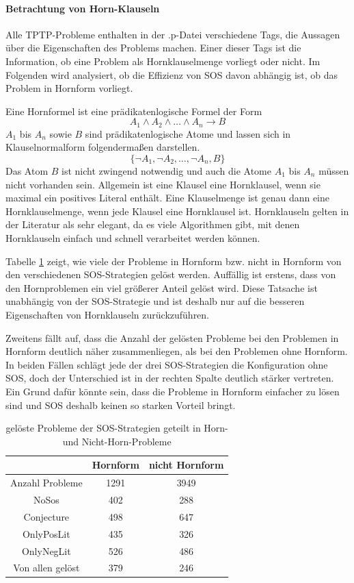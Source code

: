 		\paragraph{Betrachtung von Horn-Klauseln}
		Alle TPTP-Probleme enthalten in der .p-Datei verschiedene Tags, die Aussagen über die Eigenschaften des Problems machen. Einer dieser Tags ist die Information, ob eine Problem als Hornklauselmenge vorliegt oder nicht. Im Folgenden wird analysiert, ob die Effizienz von SOS davon abhängig ist, ob das Problem in Hornform vorliegt.
	
		Eine Hornformel ist eine prädikatenlogische Formel der Form
		$$A_1 \wedge A_2 \wedge \ldots \wedge A_n \rightarrow B$$
		$A_1$ bis $A_n$ sowie $B$ sind prädikatenlogische Atome und lassen sich in Klauselnormalform folgendermaßen darstellen.
		$$\{\neg A_1, \neg A_2, \ldots, \neg A_n, B\}$$
		Das Atom $B$ ist nicht zwingend notwendig und auch die Atome $A_1$ bis $A_n$ müssen nicht vorhanden sein. Allgemein ist eine Klausel eine Hornklausel, wenn sie maximal ein positives Literal enthält. \cite{Makowsky1987horn}
		Eine Klauselmenge ist genau dann eine Hornklauselmenge, wenn jede Klausel eine Hornklausel ist. Hornklauseln gelten in der Literatur als sehr elegant, da es viele Algorithmen gibt, mit denen Hornklauseln einfach und schnell verarbeitet werden können. \cite{Wild2017horn}
	
		Tabelle \ref{tab:Horn} zeigt, wie viele der Probleme in Hornform bzw. nicht in Hornform von den verschiedenen SOS-Strategien gelöst werden.
		Auffällig ist erstens, dass von den Hornproblemen ein viel größerer Anteil gelöst wird. Diese Tatsache ist unabhängig von der SOS-Strategie und ist deshalb nur auf die besseren Eigenschaften von Hornklauseln zurückzuführen.
		
		Zweitens fällt auf, dass die Anzahl der gelösten Probleme bei den Problemen in Hornform deutlich näher zusammenliegen, als bei den Problemen ohne Hornform. In beiden Fällen schlägt jede der drei SOS-Strategien die Konfiguration ohne SOS, doch der Unterschied ist in der rechten Spalte deutlich stärker vertreten. Ein Grund dafür könnte sein, dass die Probleme in Hornform einfacher zu lösen sind und SOS deshalb keinen so starken Vorteil bringt.
		\begin{table}
			\centering
			\begin{tabular}{|c|c|c|}
				\hline
				&Hornform & nicht Hornform \\
				\hline
				Anzahl Probleme & 1291 & 3949 \\
				\hline\hline
				NoSos & 402 & 288 \\
				\hline
				Conjecture & 498 & 647 \\
				\hline
				OnlyPosLit & 435 & 326 \\
				\hline
				OnlyNegLit & 526 & 486 \\
				\hline\hline
				Von allen gelöst & 379 & 246 \\ \hline
			\end{tabular}
		\caption{gelöste Probleme der SOS-Strategien geteilt in Horn- und Nicht-Horn-Probleme}
		\label{tab:Horn}
		\end{table}

